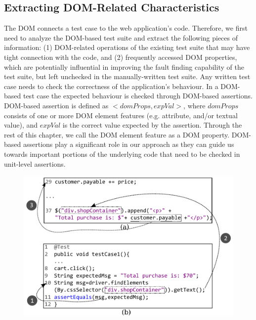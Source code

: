 \subsection{Extracting DOM-Related Characteristics} \label{Sec:extractDomRelatedInfo}
The DOM connects a test case to the web application's code. Therefore, we first need to analyze the DOM-based test suite and extract the following pieces of information: (1) DOM-related operations of the existing test suite that may have tight connection with the \javascript code, and (2) frequently accessed DOM properties, which are potentially influential in improving the fault finding capability of the test suite, but left unchecked in the manually-written test suite.
Any written test case needs to check the correctness of the application's behaviour. In a DOM-based test case the expected behaviour is checked through DOM-based assertions.
DOM-based assertion is defined as $<domProps,expVal>$, where $domProps$ consists of one or more DOM element features (e.g. attribute, and/or textual value), and $expVal$ is the correct value expected by the assertion. Through the rest of this chapter, we call the DOM element feature as a DOM property. 
DOM-based assertions play a significant role in our approach as they can guide us towards important portions of the underlying \javascript code that need to be checked in unit-level assertions.
\begin{figure}
  \centering
  \includegraphics[width=0.8\hsize]{fig/intraDOMDep}
   \vspace{0.2in} 
  \label{Fig:assertionToCode}
\end{figure}
